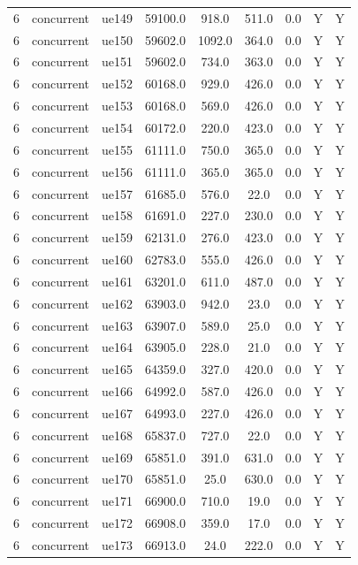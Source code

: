 \begin{table}[ht]
\begin{tabular}{|c|c|c|c|c|c|c|c|c|}
6 & concurrent & ue149 & 59100.0 & 918.0 & 511.0 & 0.0 & Y & Y \\
6 & concurrent & ue150 & 59602.0 & 1092.0 & 364.0 & 0.0 & Y & Y \\
6 & concurrent & ue151 & 59602.0 & 734.0 & 363.0 & 0.0 & Y & Y \\
6 & concurrent & ue152 & 60168.0 & 929.0 & 426.0 & 0.0 & Y & Y \\
6 & concurrent & ue153 & 60168.0 & 569.0 & 426.0 & 0.0 & Y & Y \\
6 & concurrent & ue154 & 60172.0 & 220.0 & 423.0 & 0.0 & Y & Y \\
6 & concurrent & ue155 & 61111.0 & 750.0 & 365.0 & 0.0 & Y & Y \\
6 & concurrent & ue156 & 61111.0 & 365.0 & 365.0 & 0.0 & Y & Y \\
6 & concurrent & ue157 & 61685.0 & 576.0 & 22.0 & 0.0 & Y & Y \\
6 & concurrent & ue158 & 61691.0 & 227.0 & 230.0 & 0.0 & Y & Y \\
6 & concurrent & ue159 & 62131.0 & 276.0 & 423.0 & 0.0 & Y & Y \\
6 & concurrent & ue160 & 62783.0 & 555.0 & 426.0 & 0.0 & Y & Y \\
6 & concurrent & ue161 & 63201.0 & 611.0 & 487.0 & 0.0 & Y & Y \\
6 & concurrent & ue162 & 63903.0 & 942.0 & 23.0 & 0.0 & Y & Y \\
6 & concurrent & ue163 & 63907.0 & 589.0 & 25.0 & 0.0 & Y & Y \\
6 & concurrent & ue164 & 63905.0 & 228.0 & 21.0 & 0.0 & Y & Y \\
6 & concurrent & ue165 & 64359.0 & 327.0 & 420.0 & 0.0 & Y & Y \\
6 & concurrent & ue166 & 64992.0 & 587.0 & 426.0 & 0.0 & Y & Y \\
6 & concurrent & ue167 & 64993.0 & 227.0 & 426.0 & 0.0 & Y & Y \\
6 & concurrent & ue168 & 65837.0 & 727.0 & 22.0 & 0.0 & Y & Y \\
6 & concurrent & ue169 & 65851.0 & 391.0 & 631.0 & 0.0 & Y & Y \\
6 & concurrent & ue170 & 65851.0 & 25.0 & 630.0 & 0.0 & Y & Y \\
6 & concurrent & ue171 & 66900.0 & 710.0 & 19.0 & 0.0 & Y & Y \\
6 & concurrent & ue172 & 66908.0 & 359.0 & 17.0 & 0.0 & Y & Y \\
6 & concurrent & ue173 & 66913.0 & 24.0 & 222.0 & 0.0 & Y & Y \\

\end{tabular}
\end{table}
